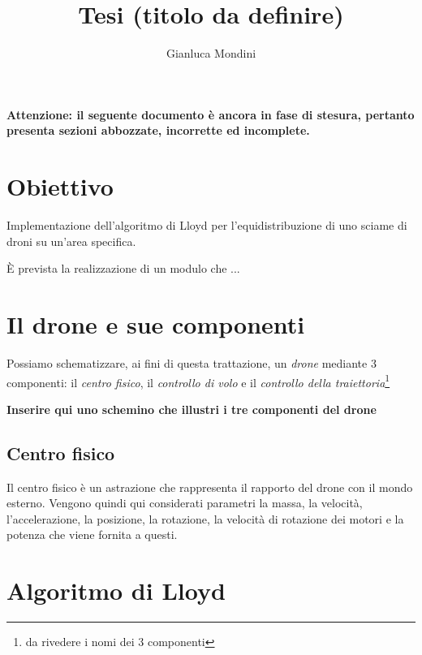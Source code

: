 \documentclass[10pt,a4paper]{article}
\author{Gianluca Mondini}
\title{Tesi (titolo da definire)}
\begin{document}
\begin{center}
\textbf{Attenzione: il seguente documento è ancora in fase di stesura, pertanto presenta sezioni abbozzate, incorrette ed incomplete.}
\end{center}

\maketitle




\section{Obiettivo}

Implementazione dell'algoritmo di Lloyd per l'equidistribuzione di uno sciame di droni su un'area specifica.

È prevista la realizzazione di un modulo che ...

\section{Il drone e sue componenti}

Possiamo schematizzare, ai fini di questa trattazione, un \textit{drone} mediante 3 componenti: il \textit{centro fisico}, il \textit{controllo di volo} e il \textit{controllo della traiettoria}\footnote{da rivedere i nomi dei 3 componenti}

\begin{center}
\textbf{Inserire qui uno schemino che illustri i tre componenti del drone}
\end{center}

\subsection{Centro fisico}

Il centro fisico è un astrazione che rappresenta il rapporto del drone con il mondo esterno. Vengono quindi qui considerati parametri la massa, la velocità, l'accelerazione, la posizione, la rotazione, la velocità di rotazione dei motori e la potenza che viene fornita a questi.

\section{Algoritmo di Lloyd}
\end{document}
